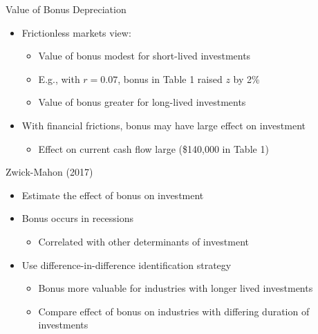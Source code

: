 \documentclass[11pt,aspectratio=169,xcolor={dvipsnames},hyperref={pdftex,pdfpagemode=UseNone,hidelinks,pdfdisplaydoctitle=true},usepdftitle=false]{beamer}
\begin{document}
\begin{frame}{Value of Bonus Depreciation}
\begin{itemize}
	\itemsep1em 
	\item Frictionless markets view:
	\begin{itemize}
		\item Value of bonus modest for short-lived investments
		\item E.g., with $r = 0.07$, bonus in Table 1 raised $z$ by 2\%
		\item Value of bonus greater for long-lived investments
	\end{itemize}
	\item With financial frictions, bonus may have large effect on investment
	\begin{itemize}
		\item Effect on current cash flow large (\$140,000 in Table 1) 
	\end{itemize}
\end{itemize}
\end{frame}


\begin{frame}{Zwick-Mahon (2017)}
\begin{itemize}
	\itemsep1em 
	\item Estimate the effect of bonus on investment
	\item Bonus occurs in recessions
	\begin{itemize}
		\item Correlated with other determinants of investment
	\end{itemize}
	\item Use difference-in-difference identification strategy
	\begin{itemize}
		\item Bonus more valuable for industries with longer lived investments
		\item Compare effect of bonus on industries with differing duration of investments 
	\end{itemize}
\end{itemize}
\end{frame}
\end{document}
